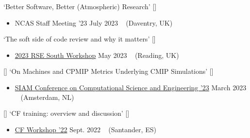 \begin{talks}
    \talk
	{\faCommentingO \hspace{1mm} `Better Software, Better (Atmospheric) Research' [\href{https://github.com/sadielbartholomew/sadielbartholomew/blob/master/talks-and-workshops/ncas-agm-23-better-atmos-software.pdf}{\small{\linkSymbol}}]}
	{
	\begin{itemize}[leftmargin=.4in]
	    \item NCAS Staff Meeting '23
	    \hfill July 2023 ~ (Daventry, UK)
	\end{itemize}
	}

    \talk
	{\faCommentingO \hspace{1mm} `The soft side of code review and why it matters' [\href{https://github.com/sadielbartholomew/sadielbartholomew/blob/master/talks-and-workshops/rse-south-soft-side-code-review.pdf}{\small{\linkSymbol}}]}
	{
	\begin{itemize}[leftmargin=.4in]
	    \item \href{https://rsesouth.github.io/workshop/}{2023 RSE South Workshop}
	    \hfill May 2023 ~ (Reading, UK)
	\end{itemize}
	}

    \talk
	{\faCommentingO \hspace{1mm} [\faEnvelopeO] \hspace{1mm} `On Machines and CPMIP Metrics Underlying CMIP Simulations' [\href{https://github.com/sadielbartholomew/sadielbartholomew/blob/master/talks-and-workshops/siam-cse-23-es-doc-cmip-platform/siam-cse-23-es-doc-cmip-platform.pdf}{\small{\linkSymbol}}]}
	{
	\begin{itemize}[leftmargin=.4in]
	    \item \href{https://www.siam.org/conferences-events/past-event-archive/cse23/}{SIAM Conference on Computational Science and Engineering '23}
	    \hfill March 2023 ~ (Amsterdam, NL)
	\end{itemize}
	}

    \talk
	{\faCommentingO \hspace{1mm} [\faEnvelopeO] \hspace{1mm} `CF training: overview and discussion' [\href{https://github.com/sadielbartholomew/sadielbartholomew/blob/master/talks-and-workshops/cf-workshop-22-RE-training.pdf}{\small{\linkSymbol}}]}
	{
	\begin{itemize}[leftmargin=.4in]
	    \item \href{https://cfconventions.org/Meetings/2022-Workshop.html}{CF Workshop '22}
	    \hfill Sept. 2022 ~ (Santander, ES)
	\end{itemize}
	}


\end{talks}
